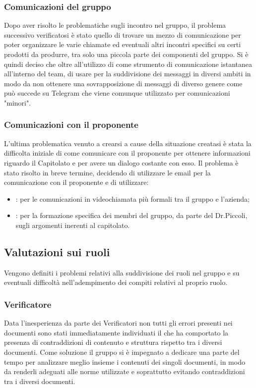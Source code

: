 \documentclass[../piano-di-qualifica.tex]{subfiles}
\begin{document}
\subsubsection{Comunicazioni del gruppo}
\label{sub:comunicazione_del_gruppo}
Dopo aver risolto le problematiche sugli incontro nel gruppo, il problema successivo verificatosi è stato quello di trovare un mezzo di comunicazione per poter organizzare le varie chiamate ed eventuali altri incontri specifici su certi prodotti da produrre, tra solo una piccola parte dei componenti del gruppo.
Si è quindi deciso che oltre all'utilizzo di  come strumento di comunicazione istantanea all'interno del team, di usare  per la suddivisione dei messaggi in diversi ambiti in modo da non ottenere una sovrapposizione di messaggi di diverso genere come può succede su Telegram che viene comunque utilizzato per comunicazioni "minori".

\subsubsection{Comunicazioni con il proponente}
\label{sub:comunicazione_con_il_proponente}
L'ultima problematica venuto a crearsi a cause della situazione creatasi è stata la difficolta iniziale di come comunicare con il proponente per ottenere informazioni riguardo il Capitolato e per avere un dialogo costante con esso.
Il problema è stato risolto in breve termine, decidendo di utilizzare le email per la comunicazione con il proponente e di utilizzare:
\begin{itemize}
    \item \textbf{}: per le comunicazioni in videochiamata più formali tra il gruppo e l'azienda;
    \item \textbf{}: per la formazione specifica dei membri del gruppo, da parte del Dr.Piccoli, sugli argomenti inerenti al capitolato.
\end{itemize}

\subsection{Valutazioni sui ruoli}
\label{sub:valutazioni_ruoli}
Vengono definiti i problemi relativi alla suddivisione dei ruoli nel gruppo e su eventuali difficoltà nell'adempimento dei compiti relativi al proprio ruolo.
\subsubsection{Verificatore}
\label{sub:verificatore}
Data l'inesperienza da parte dei Verificatori non tutti gli errori presenti nei documenti sono stati immediatamente individuati il che ha comportato la presenza di contraddizioni di contenuto e struttura rispetto tra i diversi documenti.
Come soluzione il gruppo si è impegnato a dedicare una parte del tempo per analizzare meglio insieme i contenuti dei singoli documenti, in modo da renderli adeguati alle norme utilizzate e soprattutto evitando contraddizioni tra i diversi documenti.
\end{document}
